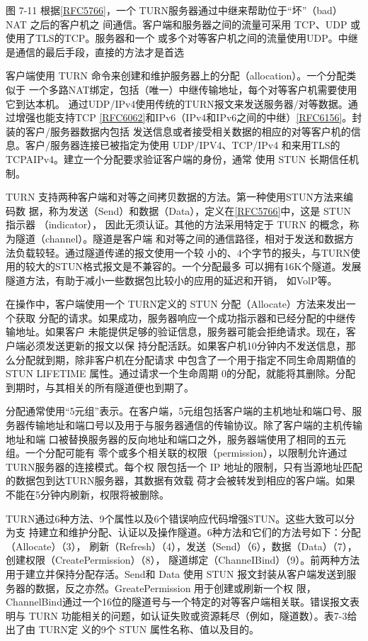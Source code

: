图 7-11
根据\href{https://www.rfc-editor.org/rfc/rfc5766}{[RFC5766]}，一个
TURN服务器通过中继来帮助位于“坏”（bad） NAT 之后的客户机之
间通信。客户端和服务器之间的流量可采用 TCP、UDP 或使用了TLS的TCP。服务器和一个
或多个对等客户机之间的流量使用UDP。中继是通信的最后手段，直接的方法才是首选

客户端使用 TURN 命令来创建和维护服务器上的分配（allocation）。一个分配类似于
一个多路NAT绑定，包括（唯一）中继传输地址，每个对等客户机需要使用它到达本机。
通过UDP/IPv4使用传统的TURN报文来发送服务器/对等数据。通过增强也能支持TCP
\href{https://www.rfc-editor.org/rfc/rfc6062}{[RFC6062]}和IPv6（IPv4和IPv6之间的中继）\href{https://www.rfc-editor.org/rfc/rfc6156}{[RFC6156]}。封装的客户/服务器数据内包括
发送信息或者接受相关数据的相应的对等客户机的信息。客户/服务器连接已被指定为使用
UDP/IPV4、TCP/IPv4 和来用TLS的TCPAIPv4。建立一个分配要求验证客户端的身份，通常
使用 STUN 长期信任机制。

TURN 支持两种客户端和对等之间拷贝数据的方法。第一种使用STUN方法来编码数
据，称为发送（Send）和数据（Data），定义在\href{https://www.rfc-editor.org/rfc/rfc5766}{[RFC5766]}中，这是
STUN 指示器 （indicator），
因此无须认证。其他的方法采用特定于 TURN 的概念，称为隧道（channel）。隧道是客户端
和对等之间的通信路径，相对于发送和数据方法负载较轻。通过隧道传递的报文使用一个较
小的、4个字节的报头，与TURN使用的较大的STUN格式报文是不兼容的。一个分配最多
可以拥有16K个隧道。发展隧道方法，有助于减小一些数据包比较小的应用的延迟和开销，
如VolP等。

在操作中，客户端使用一个 TURN定义的 STUN 分配（Allocate）方法来发出一个获取
分配的请求。如果成功，服务器响应一个成功指示器和已经分配的中继传输地址。如果客户
未能提供足够的验证信息，服务器可能会拒绝请求。现在，客户端必须发送更新的报文以保
持分配活跃。如果客户机10分钟内不发送信息，那么分配就到期，除非客户机在分配请求
中包含了一个用于指定不同生命周期值的 STUN LIFETIME 属性。通过请求一个生命周期
0的分配，就能将其删除。分配到期时，与其相关的所有隧道便也到期了。

分配通常使用“5元组”表示。在客户端，5元组包括客户端的主机地址和端口号、服
务器传输地址和端口号以及用于与服务器通信的传输协议。除了客户端的主机传输地址和端
口被替换服务器的反向地址和端口之外，服务器端使用了相同的五元组。一个分配可能有
零个或多个相关联的权限（permission），以限制允许通过TURN服务器的连接模式。每个权
限包括一个 IP 地址的限制，只有当源地址匹配的数据包到达TURN服务器，其数据有效载
荷才会被转发到相应的客户端。如果不能在5分钟内刷新，权限将被删除。

TURN通过6种方法、9个属性以及6个错误响应代码增强STUN。这些大致可以分为支
持建立和维护分配、认证以及操作隧道。6种方法和它们的方法号如下：分配（Allocate）（3），
刷新（Refresh）（4），发送（Send）（6），数据（Data）（7），创建权限（CreatePermission）（8），
隧道绑定（ChanneIBind）（9）。前两种方法用于建立并保持分配存活。Send和 Data 使用 STUN
报文封装从客户端发送到服务器的数据，反之亦然。GreatePermission 用于创建或刷新一个权
限，ChannelBind通过一个16位的隧道号与一个特定的对等客户端相关联。错误报文表明与
TURN 功能相关的问题，如认证失败或资源耗尽（例如，隧道数）。表7-3给出了由 TURN定
义的9个 STUN 属性名称、值以及目的。


